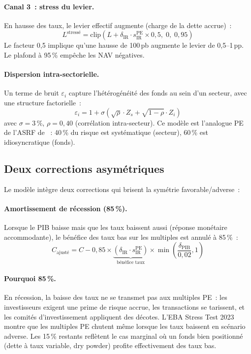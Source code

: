 \documentclass[12pt, a4paper, twoside, openright]{report}
\theoremstyle{definition}
\begin{document}
\paragraph{Canal 3~: stress du levier.} En hausse des taux, le levier effectif augmente (charge de la dette accrue)~:
\begin{equation}
L^{\text{stressé}} = \text{clip}(L + \delta_{\text{IR}} \cdot s^{\text{PE}}_{\text{IR}} \times 0{,}5, \; 0, \; 0{,}95)
\label{eq:leverage-stress}
\end{equation}
Le facteur 0{,}5 implique qu'une hausse de 100\,pb augmente le levier de 0{,}5--1\,pp. Le plafond à 95\,\% empêche les NAV négatives.

\paragraph{Dispersion intra-sectorielle.} Un terme de bruit $\varepsilon_i$ capture l'hétérogénéité des fonds au sein d'un secteur, avec une structure factorielle~:
$$\varepsilon_i = 1 + \sigma(\sqrt{\rho} \cdot Z_s + \sqrt{1-\rho} \cdot Z_i)$$
avec $\sigma = 3\,\%$, $\rho = 0{,}40$ (corrélation intra-secteur). Ce modèle est l'analogue PE de l'ASRF de \citet{vasicek2002}~: 40\,\% du risque est systématique (secteur), 60\,\% est idiosyncratique (fonds).

\subsection{Deux corrections asymétriques}

Le modèle intègre deux corrections qui brisent la symétrie favorable/adverse~:

\paragraph{Amortissement de récession (85\,\%).} Lorsque le PIB baisse mais que les taux baissent aussi (réponse monétaire accommodante), le bénéfice des taux bas sur les multiples est annulé à 85\,\%~:
$$C_{\text{ajusté}} = C - 0{,}85 \times \underbrace{(\delta_{\text{IR}} \cdot s^{\text{PE}}_{\text{IR}})}_{\text{bénéfice taux}} \times \min\!\left(\frac{\delta_{\text{PIB}}}{0{,}02}, 1\right)$$

\paragraph{Pourquoi 85\,\%.} En récession, la baisse des taux ne se transmet pas aux multiples PE~: les investisseurs exigent une prime de risque accrue, les transactions se tarissent, et les comités d'investissement appliquent des décotes. L'EBA Stress Test 2023 montre que les multiples PE chutent même lorsque les taux baissent en scénario adverse. Les 15\,\% restants reflètent le cas marginal où un fonds bien positionné (dette à taux variable, dry powder) profite effectivement des taux bas.
\end{document}
